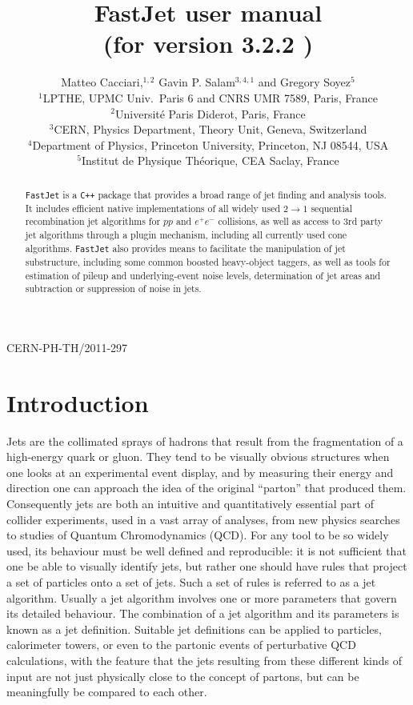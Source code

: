 \documentclass[12pt,a4]{article}
\title{\sf FastJet user manual%
  \\ \large (for version
  3.2.2%
  )
}
\author{Matteo Cacciari,$^{1,2}$ Gavin P. Salam$^{3,4,1}$ and Gregory Soyez$^{5}$\\[10pt]
  \normalsize
  $^1$LPTHE, UPMC Univ.~Paris 6 and CNRS UMR 7589, Paris, France\\
  \normalsize
  $^2$Universit\'e Paris Diderot, Paris, France\\
  \normalsize
  $^3$CERN, Physics Department, Theory Unit, Geneva, Switzerland\\
  \normalsize
  $^4$Department of Physics, Princeton University, Princeton, NJ 08544, USA\\
  \normalsize
  $^5$Institut de Physique Th\'eorique, CEA Saclay, France
}
\date{}
\newcommand{\fastjet}{\texttt{FastJet}\xspace}
\newcommand{\ttt}[1]{{\small\texttt{#1}}}
\begin{document}
\maketitle

\vspace{-10cm}
\begin{flushright}
  CERN-PH-TH/2011-297
\end{flushright}
\vspace{9cm}


\begin{abstract}

  \fastjet is a \ttt{C++} package that provides a broad range of jet
  finding and analysis tools.
  It includes efficient native implementations of all widely used $2\to 1$
  sequential recombination jet algorithms for $pp$ and $e^+e^-$
  collisions, as well as access to 3rd party jet algorithms through a
  plugin mechanism, including all currently used cone algorithms.
  \fastjet also provides means to facilitate the manipulation of jet
  substructure, including some common boosted heavy-object taggers, as
  well as tools for estimation of pileup and underlying-event noise
  levels, determination of jet areas and subtraction or suppression
  of noise in jets.

\end{abstract}

\newpage
\tableofcontents
\newpage

\section{Introduction}




Jets are the collimated sprays of hadrons that result from the
fragmentation of a high-energy quark or gluon.
%
They tend to be visually obvious structures when one looks at an
experimental event display, and by measuring their energy and
direction one can approach the idea of the original ``parton'' that
produced them.
%
Consequently jets are both an intuitive and quantitatively essential
part of collider experiments, used in a vast array of analyses, from
new physics searches to studies of Quantum Chromodynamics (QCD).
%
For any tool to be so widely used, its behaviour must be well defined
and reproducible: it is not sufficient that one be able to visually
identify jets, but rather one should have rules that project a set of
particles onto a set of jets.
%
Such a set of rules is referred to as a jet algorithm.
%
Usually a jet algorithm involves one or more parameters that govern
its detailed behaviour.
%
The combination of a jet algorithm and its parameters is known as a
jet definition.
%
Suitable jet definitions can be applied to particles,
calorimeter towers, or even to the partonic events of perturbative QCD
calculations, with the feature that the jets resulting from these
different kinds of input are not just physically close to the
concept of partons, but can be meaningfully be compared to each other.
\end{document}

